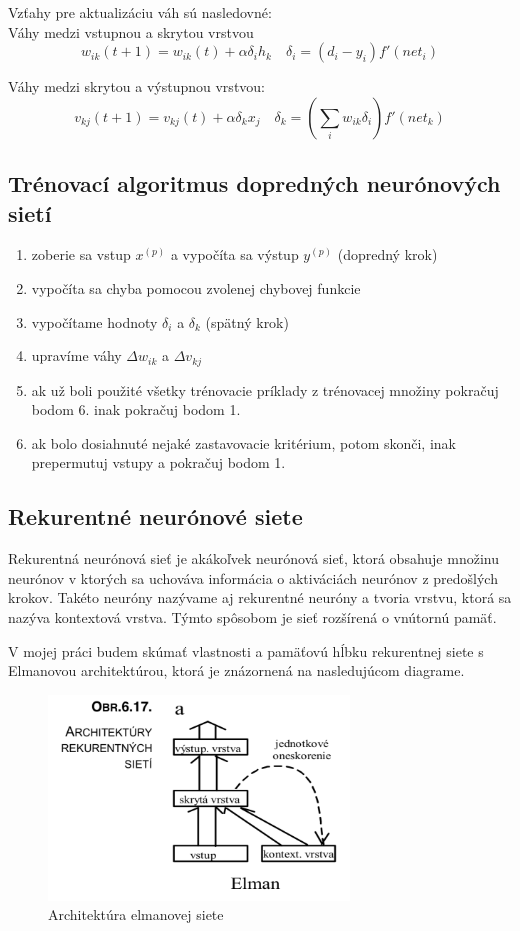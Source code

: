 Vzťahy pre aktualizáciu váh sú nasledovné: \\

Váhy medzi vstupnou a skrytou vrstvou
\begin{equation}
	w_{ik}(t+1) = w_{ik}(t) + \alpha\delta_{i}h_{k} \quad \delta_{i} = (d_i - y_i)f'(net_{i})
\end{equation}

Váhy medzi skrytou a výstupnou vrstvou: 
\begin{equation}
	v_{kj}(t+1) = v_{kj}(t) + \alpha\delta_{k}x_{j} \quad \delta_{k} = (\sum_{i} w_{ik}\delta_{i})f'(net_{k})
\end{equation}

\subsection{Trénovací algoritmus dopredných neurónových sietí}
\begin{enumerate}
	\item zoberie sa vstup $x^{(p)}$ a vypočíta sa výstup $y^{(p)}$ (dopredný krok)
	\item vypočíta sa chyba pomocou zvolenej chybovej funkcie
	\item vypočítame hodnoty $\delta_{i}$ a $\delta_{k}$  (spätný krok)
	\item upravíme váhy $\Delta w_{ik}$ a $\Delta v_{kj}$
	\item ak už boli použité všetky trénovacie príklady z trénovacej množiny pokračuj bodom 6. inak pokračuj bodom 1.
	\item ak bolo dosiahnuté nejaké zastavovacie kritérium, potom skonči, inak prepermutuj vstupy a pokračuj bodom 1.
\end{enumerate}
                         

\subsection{Rekurentné neurónové siete}
Rekurentná neurónová sieť je akákoľvek neurónová sieť, ktorá obsahuje množinu neurónov
v ktorých sa uchováva informácia o aktiváciách neurónov z predošlých krokov. Takéto neuróny
nazývame aj rekurentné neuróny a tvoria vrstvu, ktorá sa nazýva kontextová vrstva.
Týmto spôsobom je sieť rozšírená o vnútornú pamäť.

V mojej práci budem skúmať vlastnosti a pamäťovú hĺbku rekurentnej siete s Elmanovou architektúrou, 
ktorá je znázornená na nasledujúcom diagrame.

\begin{figure}[H]
	\centering
	\includegraphics[width=8cm]{assets/elman_architecture}
	\caption{Architektúra elmanovej siete}
\end{figure}

